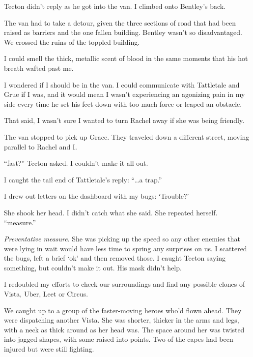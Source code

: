 Tecton didn't reply as he got into the van.  I climbed onto Bentley's back.



The van had to take a detour, given the three sections of road that had been raised as barriers and the one fallen building.  Bentley wasn't so disadvantaged.  We crossed the ruins of the toppled building.



I could smell the thick, metallic scent of blood in the same moments that his hot breath wafted past me.



I wondered if I should be in the van.  I could communicate with Tattletale and Grue if I was, and it would mean I wasn't experiencing an agonizing pain in my side every time he set his feet down with too much force or leaped an obstacle.



That said, I wasn't sure I wanted to turn Rachel away if she was being friendly.



The van stopped to pick up Grace.  They traveled down a different street, moving parallel to Rachel and I.



``\ldotsso fast?'' Tecton asked.  I couldn't make it all out.



I caught the tail end of Tattletale's reply: ``\ldots a trap.''



I drew out letters on the dashboard with my bugs: `Trouble?'



She shook her head.  I didn't catch what she said.  She repeated herself.  ``\ldotsventative measure.''



\emph{Preventative measure}.  She was picking up the speed so any other enemies that were lying in wait would have less time to spring any surprises on us.  I scattered the bugs, left a brief `ok' and then removed those.  I caught Tecton saying something, but couldn't make it out.  His mask didn't help.



I redoubled my efforts to check our surroundings and find any possible clones of Vista, Uber, Leet or Circus.



We caught up to a group of the faster-moving heroes who'd flown ahead.  They were dispatching another Vista.  She was shorter, thicker in the arms and legs, with a neck as thick around as her head was.  The space around her was twisted into jagged shapes, with some raised into points.  Two of the capes had been injured but were still fighting.



